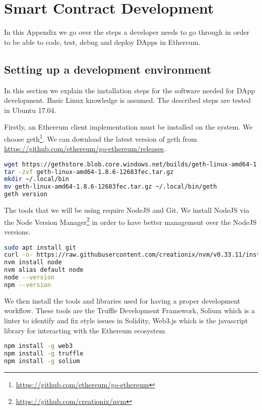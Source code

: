 \chapter{Smart Contract Development}

In this Appendix we go over the steps a developer needs to go through in order to be able to code, test, debug and deploy DApps in Ethereum. 

\section{Setting up a development environment}
In this section we explain the installation steps for the software needed for DApp development. Basic Linux knowledge is assumed. The described steps are tested in Ubuntu 17.04.

Firstly, an Ethereum client implementation must be installed on the system. We choose geth\footnote{\url{https://github.com/ethereum/go-ethereum}}. We can download the latest version of geth from \url{https://github.com/ethereum/go-ethereum/releases}. 

\begin{lstlisting}[language=bash,caption={Installing geth}]
wget https://gethstore.blob.core.windows.net/builds/geth-linux-amd64-1.8.6-12683fec.tar.gzI
tar -zvf geth-linux-amd64-1.8.6-12683fec.tar.gz
mkdir ~/.local/bin
mv geth-linux-amd64-1.8.6-12683fec.tar.gz ~/.local/bin/geth
geth version
\end{lstlisting}

The tools that we will be using require NodeJS and Git. We install NodeJS via the Node Version Manager\footnote{\url{https://github.com/creationix/nvm}} in order to have better management over the NodeJS versions.

\begin{lstlisting}[language=bash,caption={Installing node and git }]
sudo apt install git
curl -o- https://raw.githubusercontent.com/creationix/nvm/v0.33.11/install.sh | bash
nvm install node
nvm alias default node
node --version
npm --version
\end{lstlisting}

We then install the tools and libraries used for having a proper development workflow. These tools are the Truffle Development Framework, Solium which is a linter to identify and fix style issues in Solidity, Web3.js which is the javascript library for interacting with the Ethereum ecosystem

\begin{lstlisting}[language=bash,caption={Installing development tools}]
npm install -g web3
npm install -g truffle
npm install -g solium
\end{lstlisting}

